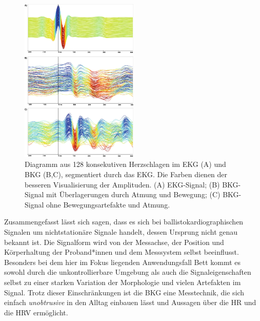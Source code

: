 	\begin{figure}[H]
		\centering
		\includegraphics[width=0.5\textwidth]{pic/Variabilitaet.jpg}
		\caption[Visualisierung der Variabilität des \ac{BKG}-Signals]{Diagramm aus 128 konsekutiven Herzschlagen im EKG (A) und BKG (B,C), segmentiert durch das EKG. Die Farben dienen der besseren Visualisierung der Amplituden. (A) EKG-Signal; (B) BKG-Signal mit Überlagerungen durch Atmung und Bewegung; (C) \ac{BKG}-Signal ohne Bewegungsartefakte und Atmung.\protect\footnotemark}
		\label{fig:variabilitaet}
	\end{figure}
	
	
	Zusammengefasst lässt sich sagen, dass es sich bei ballistokardiographischen Signalen um nichtstationäre Signale handelt, dessen Ursprung nicht genau bekannt ist. Die Signalform wird von der Messachse, der Position und Körperhaltung der Proband*innen und dem Messsystem selbst beeinflusst. Besonders bei dem hier im Fokus liegenden Anwendungsfall Bett kommt es sowohl durch die unkontrollierbare Umgebung als auch die Signaleigenschaften selbst zu einer starken Variation der Morphologie und vielen Artefakten im Signal. Trotz dieser Einschränkungen ist die \acl{BKG} eine Messtechnik, die sich einfach \textit{unobtrusive} in den Alltag einbauen lässt und Aussagen über die \acl{HR} und die \acl{HRV} ermöglicht.

